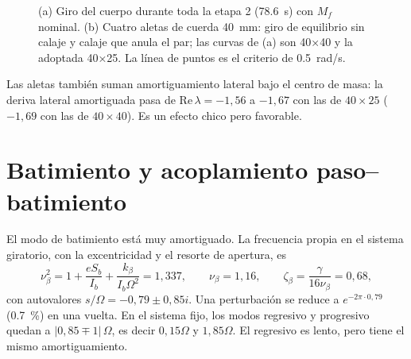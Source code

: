 \begin{figure}[H]
\centering
{}
\caption{(a) Giro del cuerpo durante toda la etapa 2 (\SI{78.6}{s}) con $M_f$ nominal.
(b) Cuatro aletas de cuerda \SI{40}{mm}: giro de equilibrio sin calaje y calaje que anula el par; las curvas de (a) son 40×40 y la adoptada 40×25. La línea de
puntos es el criterio de \SI{0.5}{rad/s}.}
\label{fig:estabilidad-giro}
\end{figure}

Las aletas también suman amortiguamiento lateral bajo el centro de masa: la deriva
lateral amortiguada pasa de $\mathrm{Re}\,\lambda=-1{,}56$ a $-1{,}67$ con las de $40\times25$ ($-1{,}69$ con las de $40\times40$). Es un efecto chico
pero favorable.

\section{Batimiento y acoplamiento paso--batimiento}\label{sec:estabilidad-flap}

El modo de batimiento está muy amortiguado. La frecuencia propia en el sistema giratorio,
con la excentricidad y el resorte de apertura, es
\begin{equation}
  \nu_\beta^2=1+\frac{eS_b}{I_b}+\frac{k_\beta}{I_b\Omega^2}=1{,}337,\qquad
  \nu_\beta=1{,}16,\qquad \zeta_\beta=\frac{\gamma}{16\nu_\beta}=0{,}68,
  \label{eq:estabilidad-nub}
\end{equation}
con autovalores $s/\Omega=-0{,}79\pm0{,}85i$. Una perturbación se reduce a $e^{-2\pi\cdot0{,}79}$ (\SI{0.7}{\percent})
en una vuelta. En el sistema fijo, los modos regresivo y progresivo quedan a
$|0{,}85\mp1|\,\Omega$, es decir $0{,}15\Omega$ y $1{,}85\Omega$. El regresivo es lento, pero
tiene el mismo amortiguamiento.

